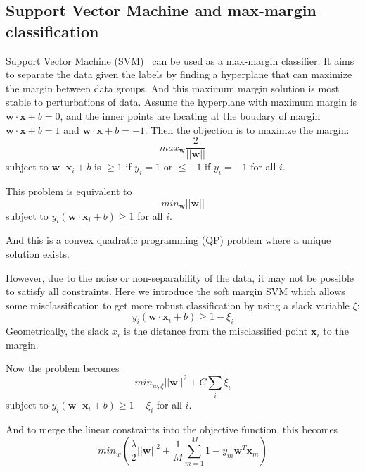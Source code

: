 \documentclass[11pt]{article}
\begin{document}
\subsection{Support Vector Machine and max-margin classification}
Support Vector Machine (SVM)~\cite{noble2006support} can be used as a max-margin classifier. It aims to separate the data given the labels by finding a hyperplane that can maximize the margin between data groups. And this maximum margin solution is most stable to perturbations of data. Assume the hyperplane with maximum margin is $\textbf{w} \cdot \textbf{x} + b = 0$, and the inner points are locating at the boudary of margin $\textbf{w} \cdot \textbf{x} + b = 1$ and $\textbf{w} \cdot \textbf{x} + b = -1$. Then the objection is to maximze the margin:\newpage
\begin{equation}
    max_{\textbf{w}} \frac{2}{||\textbf{w}||}
\end{equation}
subject to $\textbf{w} \cdot \textbf{x}_i + b$ is $\geq 1$ if $y_i = 1$ or $\leq -1$ if $y_i = -1$ for all $i$.

This problem is equivalent to 
\begin{equation}
    min_{\textbf{w}} ||\textbf{w}||
\end{equation}
subject to $y_i (\textbf{w}\cdot \textbf{x}_i + b) \geq 1$ for all $i$. 

And this is a convex quadratic programming (QP) problem where a unique solution exists.

However, due to the noise or non-separability of the data, it may not be possible to satisfy all constraints. Here we introduce the soft margin SVM which allows some misclassification to get more robust classification by using a slack variable $\xi$:
\begin{equation}
    y_i (\textbf{w} \cdot \textbf{x}_i + b) \geq 1 - \xi_i
\end{equation}
Geometrically, the slack $x_i$ is the distance from the misclassified point $\textbf{x}_i$ to the margin.

Now the problem becomes
\begin{equation}
    min_{w,\xi} ||\textbf{w}||^2 + C \sum_{i} \xi_i
\end{equation}
subject to $y_i (\textbf{w}\cdot \textbf{x}_i + b) \geq 1 - \xi_i$ for all $i$.

And to merge the linear constraints into the objective function, this becomes
\begin{equation}
    min_{w} (\frac{\lambda}{2}||\textbf{w}||^2 + \frac{1}{M} \sum_{m=1}^{M} 1 - y_m \textbf{w}^T \textbf{x}_m)
\end{equation}
\end{document}
